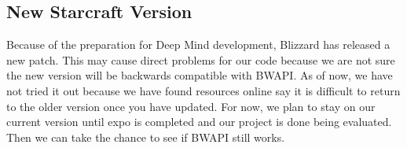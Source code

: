 \documentclass[10pt,letterpaper,onecolumn,draftclsnofoot]{IEEEtran}
\begin{document}
\subsection{New Starcraft Version}
Because of the preparation for Deep Mind development, Blizzard has released a new patch. This may cause direct problems for our code because we are not sure the new version will be backwards compatible with BWAPI. As of now, we have not tried it out because we have found resources online say it is difficult to return to the older version once you have updated. For now, we plan to stay on our current version until expo is completed and our project is done being evaluated. Then we can take the chance to see if BWAPI still works.
\end{document}
